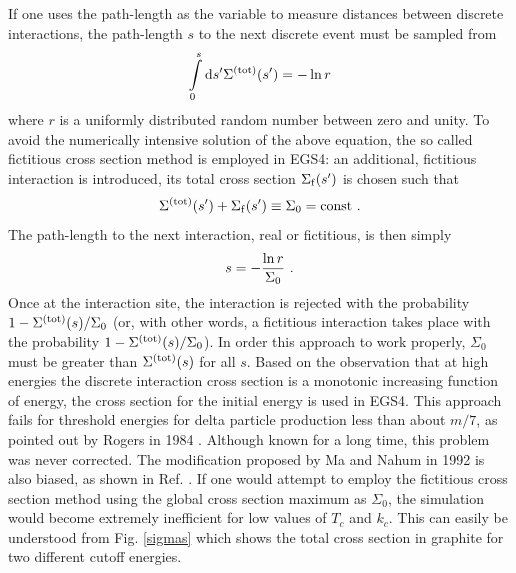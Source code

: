 If one uses the path-length as the variable to measure
distances between discrete interactions, the path-length
$s$ to the next discrete event must be sampled from
\begin{equation}
\int\limits_0^s {\rm d} s' \Sigma^{\rm (tot)}(s') = -\ln r
\end{equation}
where $r$ is a uniformly distributed random number between
zero and unity. To avoid the numerically intensive
solution of the above equation, the so called
fictitious cross section method is employed in EGS4: an additional,
fictitious interaction is introduced, its total cross section
$\Sigma_{\rm f}(s')$ is chosen such that
\begin{equation}
\Sigma^{\rm (tot)}(s') + \Sigma_{\rm f}(s') \equiv \Sigma_0 = \text{const}~.
\end{equation}
The path-length to the next interaction, real or fictitious, is then
simply
\begin{equation}
s = -{ \ln r \over \Sigma_0 }~.
\end{equation}
Once at the interaction site, the interaction is rejected with the
probability $1 - \Sigma^{\rm (tot)}(s)/\Sigma_0$ (or, with other words,
a fictitious interaction takes place with the probability
$1 - \Sigma^{\rm (tot)}(s)/\Sigma_0$). In order this approach to work
properly, $\Sigma_0$ must be greater than $\Sigma^{\rm (tot)}(s)$ for
all $s$. Based on the observation that at high energies the
discrete interaction cross section is a monotonic increasing function
of energy, the cross section for the initial energy is used in EGS4.
This approach fails for threshold energies for delta particle
production less than about $m/7$, as pointed out by Rogers
in 1984 \cite{Ro84}. Although known for a long time, this problem
was never corrected. The modification proposed by Ma and Nahum
in 1992 \cite{MN92} is also biased, as shown in Ref. \cite{Ka99a}.
If one would attempt to employ the fictitious cross section method
using the global cross section maximum as $\Sigma_0$, the
simulation would become extremely inefficient for low values
of $T_c$ and $k_c$. This can easily be understood from
Fig. \ref{sigmas} which shows the total cross section in graphite
for two different cutoff energies.
